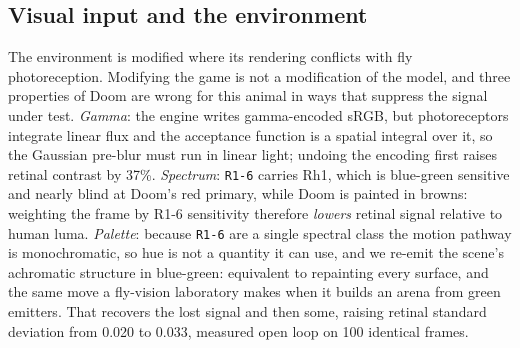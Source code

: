 \documentclass[10pt,twoside]{article}
\newcommand{\cell}[1]{\texttt{#1}}
\begin{document}
\subsection{Visual input and the environment}

The environment is modified where its rendering conflicts with fly
photoreception. Modifying the game is not a modification of the model, and
three properties of Doom are wrong
for this animal in ways that suppress the signal under test. \emph{Gamma}: the
engine writes gamma-encoded sRGB, but photoreceptors integrate linear flux and
the acceptance function is a spatial integral over it, so the Gaussian pre-blur
must run in linear light; undoing the encoding first raises retinal contrast by
37\%. \emph{Spectrum}: \cell{R1-6} carries Rh1, which is blue-green sensitive
and nearly blind at Doom's red primary, while Doom is painted in browns:
weighting the frame by R1-6 sensitivity therefore \emph{lowers} retinal signal
relative to human luma. \emph{Palette}: because \cell{R1-6} are a single
spectral class the motion pathway is monochromatic, so hue is not a quantity it
can use, and we re-emit the scene's achromatic structure in blue-green:
equivalent to repainting every surface, and the same move a fly-vision
laboratory makes when it builds an arena from green emitters. That recovers the
lost signal and then some, raising retinal standard deviation from 0.020 to
0.033, measured open loop on 100 identical frames.
\end{document}
